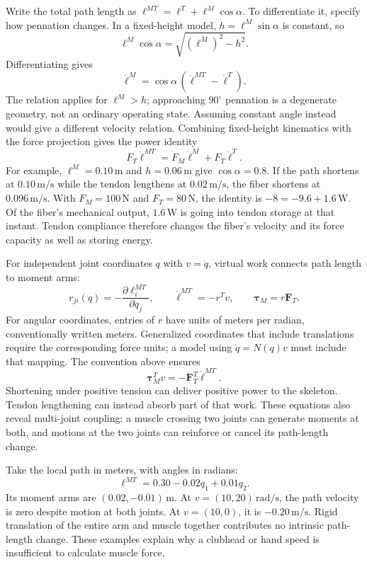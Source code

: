 Write the total path length as $\ell^{MT}=\ell^T+\ell^M\cos\alpha$. To differentiate it, specify how pennation changes. In a fixed-height model, $h=\ell^M\sin\alpha$ is constant, so
\[
\ell^M\cos\alpha=\sqrt{(\ell^M)^2-h^2}.
\]
Differentiating gives
\[
\dot\ell^M=\cos\alpha\,(\dot\ell^{MT}-\dot\ell^T).
\]
The relation applies for $\ell^M>h$; approaching $90^\circ$ pennation is a degenerate geometry, not an ordinary operating state. Assuming constant angle instead would give a different velocity relation. Combining fixed-height kinematics with the force projection gives the power identity
\[
F_T\dot\ell^{MT}=F_M\dot\ell^M+F_T\dot\ell^T.
\]
For example, $\ell^M=0.10\,\mathrm{m}$ and $h=0.06\,\mathrm{m}$ give $\cos\alpha=0.8$. If the path shortens at $0.10\,\mathrm{m/s}$ while the tendon lengthens at $0.02\,\mathrm{m/s}$, the fiber shortens at $0.096\,\mathrm{m/s}$. With $F_M=100\,\mathrm{N}$ and $F_T=80\,\mathrm{N}$, the identity is $-8=-9.6+1.6\,\mathrm{W}$. Of the fiber's mechanical output, $1.6\,\mathrm{W}$ is going into tendon storage at that instant. Tendon compliance therefore changes the fiber's velocity and its force capacity as well as storing energy.

For independent joint coordinates $q$ with $v=\dot q$, virtual work connects path length to moment arms:
\[
r_{ji}(q)=-\frac{\partial\ell_i^{MT}}{\partial q_j},
\qquad \dot{\boldsymbol\ell}^{MT}=-r^T v,
\qquad \boldsymbol\tau_M=r\boldsymbol F_T.
\]
For angular coordinates, entries of $r$ have units of meters per radian, conventionally written meters. Generalized coordinates that include translations require the corresponding force units; a model using $\dot q=N(q)v$ must include that mapping. The convention above ensures
\[
\boldsymbol\tau_M^T v=-\boldsymbol F_T^T\dot{\boldsymbol\ell}^{MT}.
\]
Shortening under positive tension can deliver positive power to the skeleton. Tendon lengthening can instead absorb part of that work. These equations also reveal multi-joint coupling: a muscle crossing two joints can generate moments at both, and motions at the two joints can reinforce or cancel its path-length change.

Take the local path in meters, with angles in radians:
\[
\ell^{MT}=0.30-0.02q_1+0.01q_2.
\]
 Its moment arms are $(0.02,-0.01)\,\mathrm{m}$. At $v=(10,20)\,\mathrm{rad/s}$, the path velocity is zero despite motion at both joints. At $v=(10,0)$, it is $-0.20\,\mathrm{m/s}$. Rigid translation of the entire arm and muscle together contributes no intrinsic path-length change. These examples explain why a clubhead or hand speed is insufficient to calculate muscle force.

